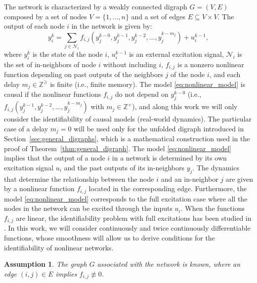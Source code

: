 \documentclass[letterpaper,10pt,journal]{IEEEtran}
\newtheorem{assumption}{Assumption}
\newcommand{\NN}{\mathcal{N}}
\begin{document}
The network is characterized by a weakly connected digraph $G=(V,E)$ composed by a set of nodes $V=\{ 1,\ldots,n\}$ and a set of edges $E\subseteq V\times V$. 
The output of each node $i$ in the network is given by: 
\begin{equation}\label{eq:nonlinear_model}
y_i^k=\sum_{j\in \mathcal{N}_i}f_{i,j}(y_j^{k-0},y_j^{k-1},y_j^{k-2},\ldots,y_j^{k-m_j})+u_i^{k-1}, 
\end{equation}
where $y_i^k$ is the state of the node $i$, $u_i^{k-1}$ is an external excitation signal, $\NN_i$ is the set of in-neighbors of node $i$ without including $i$, $f_{i,j}$ is a nonzero nonlinear function depending on past outputs of the neighbors $j$ of the node $i$, and each delay $m_j\in\mathbb{Z}^{\ge}$ is finite (i.e., finite memory).
The model \eqref{eq:nonlinear_model} is causal if the nonlinear functions $f_{i,j}$ do not depend on $y_j^{k-0}$ (i.e., $f_{i,j}(y_j^{k-1},y_j^{k-2},\ldots,y_j^{k-m_j})$ with $m_j\in\mathbb{Z}^+$),   and along this work we will only consider the identifiability of causal models (real-world dynamics). The particular case of a delay $m_j=0$ will be used only for the unfolded digraph introduced in Section~\ref{sec:general_digraphs}, which is a mathematical construction used in the proof of Theorem~\ref{thm:general_digraph}. The model \eqref{eq:nonlinear_model} implies that the output of a node $i$ in a network is determined by its own excitation signal $u_i$ and the past outputs of its in-neighbors $y_j$. The dynamics that determine the relationship between the node $i$ and an in-neighbor $j$ are given by a nonlinear function $f_{i,j}$ located in the corresponding edge.
Furthermore, the model \eqref{eq:nonlinear_model} corresponds to the full excitation case where all the nodes in the network can be excited through the inputs $u_i$. When the functions $f_{i,j}$ are linear, the identifiability problem with full excitations has been studied in \cite{hendrickx2019identifiability}. In this work, we will consider continuously and twice continuously differentiable functions, whose smoothness will allow us to derive conditions for the identifiability of nonlinear networks.


\begin{assumption}\label{ass:full_excitation}
    The graph $G$ associated with the network is known, where an edge $(i,j)\in E$ implies $f_{i,j}\not\equiv  0$.
\end{assumption}
\end{document}
